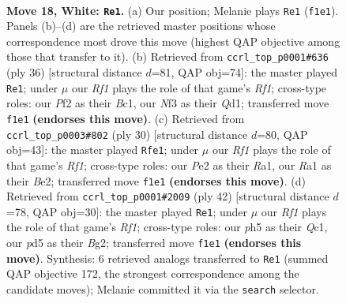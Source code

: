 \documentclass[11pt]{article}
\begin{document}
\clearpage

\begin{figure}[p]\centering
\begin{subfigure}{0.46\textwidth}\centering
\resizebox{\linewidth}{!}{%
\newchessgame
\chessboard[
  setfen={r1b1k2r/2p1qp2/2n2np1/3p3p/p2P4/P4NP1/3BPPBP/R2Q1RK1 w q - 4 18},
  showmover=false,
  pgfstyle=straightmove, color=movearrow, markmove={f1-e1}
]}
\caption{}
\end{subfigure}\hfill
\begin{subfigure}{0.46\textwidth}\centering
\resizebox{\linewidth}{!}{%
\newchessgame
\chessboard[
  setfen={1k1r1b1r/1pp1q1pb/p1n2p1p/P7/2BP4/2P1PN2/6PP/R1BQ1RK1 w - - 0 19},
  showmover=false,
  pgfstyle=straightmove, color=movearrow, markmove={f1-e1}
]}
\caption{}
\end{subfigure}
\\[4pt]
\begin{subfigure}{0.46\textwidth}\centering
\resizebox{\linewidth}{!}{%
\newchessgame
\chessboard[
  setfen={r1br2k1/p1p1qppp/1p3n2/3p4/3P4/2N1P2P/PPQ1BPP1/R4RK1 w - - 3 16},
  showmover=false,
  pgfstyle=straightmove, color=movearrow, markmove={f1-e1}
]}
\caption{}
\end{subfigure}\hfill
\begin{subfigure}{0.46\textwidth}\centering
\resizebox{\linewidth}{!}{%
\newchessgame
\chessboard[
  setfen={r4rk1/p1q1npp1/b4n1p/2pp4/1P6/P1N2NP1/4PPBP/1RQ2RK1 w - - 1 22},
  showmover=false,
  pgfstyle=straightmove, color=movearrow, markmove={f1-e1}
]}
\caption{}
\end{subfigure}
\caption{\textbf{Move 18, White: \texttt{Re1}.} (a) Our position; Melanie plays \texttt{Re1} (\texttt{f1e1}). Panels (b)--(d) are the retrieved master positions whose correspondence most drove this move (highest QAP objective among those that transfer to it). (b) Retrieved from \texttt{ccrl\_top\_p0001\#636} (ply 36) [structural distance $d$=81, QAP obj=74]: the master played \texttt{Re1}; under $\mu$ our \emph{Rf1} plays the role of that game's \emph{Rf1}; cross-type roles: our \emph{P}f2 as their \emph{B}c1, our \emph{N}f3 as their \emph{Q}d1; transferred move \texttt{f1e1} \textbf{(endorses this move)}. (c) Retrieved from \texttt{ccrl\_top\_p0003\#802} (ply 30) [structural distance $d$=80, QAP obj=43]: the master played \texttt{Rfe1}; under $\mu$ our \emph{Rf1} plays the role of that game's \emph{Rf1}; cross-type roles: our \emph{P}e2 as their \emph{R}a1, our \emph{R}a1 as their \emph{B}e2; transferred move \texttt{f1e1} \textbf{(endorses this move)}. (d) Retrieved from \texttt{ccrl\_top\_p0001\#2009} (ply 42) [structural distance $d$=78, QAP obj=30]: the master played \texttt{Re1}; under $\mu$ our \emph{Rf1} plays the role of that game's \emph{Rf1}; cross-type roles: our \emph{p}h5 as their \emph{Q}c1, our \emph{p}d5 as their \emph{B}g2; transferred move \texttt{f1e1} \textbf{(endorses this move)}. Synthesis: 6 retrieved analogs transferred to \texttt{Re1} (summed QAP objective 172, the strongest correspondence among the candidate moves); Melanie committed it via the \texttt{search} selector.}
\label{fig:thought-m34}
\end{figure}
\end{document}
